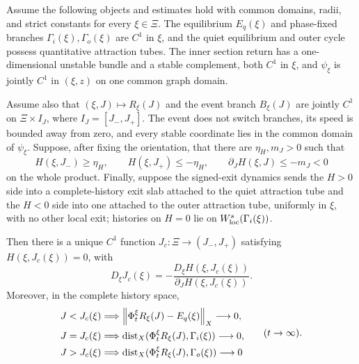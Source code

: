\begin{theorem}
\label{thm:pulse-completion}
Assume the following objects and estimates hold with common domains, radii,
and strict constants for every \(\xi\in\Xi\).  The equilibrium
\(E_q(\xi)\) and phase-fixed branches \(\Gamma_i(\xi),\Gamma_o(\xi)\) are
\(C^1\) in \(\xi\), and the quiet equilibrium and outer cycle possess
quantitative attraction tubes.  The inner section return has a
one-dimensional unstable bundle and a stable complement, both \(C^1\) in
\(\xi\), and \(\psi_\xi\) is jointly \(C^1\) in \((\xi,z)\) on one common
graph domain.

Assume also that \((\xi,J)\mapsto R_\xi(J)\) and the event branch
\(B_\xi(J)\) are jointly \(C^1\) on
\(\Xi\times I_J\), where \(I_J=[J_-,J_+]\).  The event does not switch
branches, its speed is bounded away from zero, and every stable coordinate
lies in the common domain of \(\psi_\xi\).  Suppose, after fixing the
orientation, that there are \(\eta_H,m_J>0\) such that
\begin{equation}
 H(\xi,J_-)\ge\eta_H,
 \qquad H(\xi,J_+)\le-\eta_H,
 \qquad \partial_JH(\xi,J)\le-m_J<0                   \label{eq:gap-crossing}
\end{equation}
on the whole product.  Finally, suppose the signed-exit dynamics sends the
\(H>0\) side into a complete-history exit slab attached to the quiet
attraction tube and the \(H<0\) side into one attached to the outer
attraction tube, uniformly in \(\xi\), with no other local exit; histories on
\(H=0\) lie on \(W^s_{\rm loc}(\Gamma_i(\xi))\).

Then there is a unique \(C^1\) function
\(J_c:\Xi\to(J_-,J_+)\) satisfying \(H(\xi,J_c(\xi))=0\), with
\begin{equation}
 D_\xi J_c(\xi)
 =-\frac{D_\xi H(\xi,J_c(\xi))}
          {\partial_JH(\xi,J_c(\xi))}.                 \label{eq:threshold-derivative}
\end{equation}
Moreover, in the complete history space,
\begin{equation}
 \begin{aligned}
 J<J_c(\xi)&\Longrightarrow
   \left\lVert\Phi_t^\xi R_\xi(J)-E_q(\xi)\right\rVert_X\longrightarrow0,\\
 J=J_c(\xi)&\Longrightarrow
   \operatorname{dist}_X(\Phi_t^\xi R_\xi(J),\Gamma_i(\xi))
      \longrightarrow0,\\
 J>J_c(\xi)&\Longrightarrow
   \operatorname{dist}_X(\Phi_t^\xi R_\xi(J),\Gamma_o(\xi))
      \longrightarrow0
 \end{aligned}
 \qquad(t\to\infty).                                  \label{eq:routing}
\end{equation}
\end{theorem}

